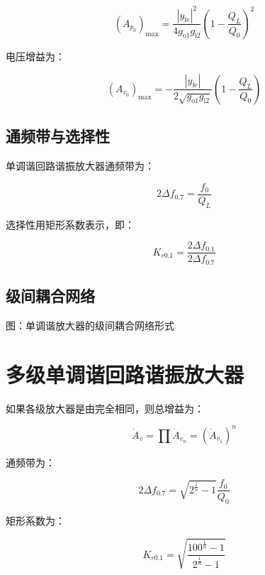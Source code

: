 \begin{equation}
    (A_{p_0})_{\text{max}} = \frac{|y_{\text{fe}}|^2}{4 g_{\text{o}1} g_{\text{i}2}} \left(1 - \frac{Q_L}{Q_0}\right)^2
\end{equation}

电压增益为：

\begin{equation}
    (A_{v_0})_{\text{max}} = - \frac{|y_{\text{fe}}|}{2\sqrt{g_{\text{o}1} g_{\text{i}2}}} \left(1 - \frac{Q_L}{Q_0}\right)
\end{equation}

\subsection{通频带与选择性}

单调谐回路谐振放大器通频带为：

\begin{equation}
    2 \Delta f_{0.7} = \frac{f_0}{Q_L}
\end{equation}

选择性用矩形系数表示，即：

\begin{equation}
    K_{r0.1} = \frac{2 \Delta f_{0.1}}{2 \Delta f_{0.7}}
\end{equation}

\subsection{级间耦合网络}

图：单调谐放大器的级间耦合网络形式

\section{多级单调谐回路谐振放大器}

如果各级放大器是由完全相同，则总增益为：

\begin{equation}
    \dot{A}_{v} = \prod{\dot{A}_{v_n}} = \left(\dot{A}_{v_1}\right)^n
\end{equation}

通频带为：

\begin{equation}
    2 \Delta f_{0.7} = \sqrt{2^{\frac{1}{n}} - 1} \frac{f_0}{Q_0}
\end{equation}

矩形系数为：

\begin{equation}
    K_{r0.1} = \sqrt{\frac{100^{\frac{1}{n}} - 1}{2^{\frac{1}{n}} - 1}}
\end{equation}

